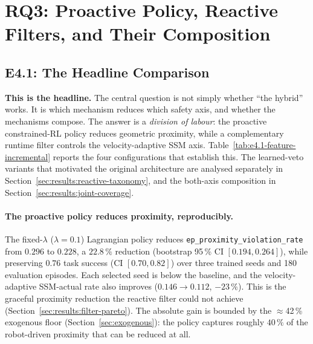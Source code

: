 \documentclass[11pt,a4paper]{report}
\newcommand{\ssm}{SSM}
\begin{document}
\section{RQ3: Proactive Policy, Reactive Filters, and Their Composition}
\label{sec:results:rq3}

\subsection{E4.1: The Headline Comparison}
\label{sec:results:headline-feature-table}

\textbf{This is the headline.} The central question is not simply
whether ``the hybrid'' works. It is which mechanism reduces which
safety axis, and whether the mechanisms compose. The answer is a
\emph{division of labour}: the proactive constrained-RL policy reduces
geometric proximity, while a complementary runtime filter controls the
velocity-adaptive \ssm{} axis. Table~\ref{tab:e4.1-feature-incremental}
reports the four configurations that establish this. The learned-veto
variants that motivated the original architecture are analysed
separately in Section~\ref{sec:results:reactive-taxonomy}, and the
both-axis composition in Section~\ref{sec:results:joint-coverage}.

\paragraph{The proactive policy reduces proximity, reproducibly.}
The fixed-$\lambda$ ($\lambda = 0.1$) Lagrangian policy reduces
\texttt{ep\_proximity\_violation\_rate} from $0.296$ to $0.228$, a
$22.8\,\%$ reduction (bootstrap 95\,\% CI $[0.194, 0.264]$), while
preserving $0.76$ task success (CI $[0.70, 0.82]$) over three trained
seeds and 180 evaluation episodes. Each selected seed is below the
baseline, and the velocity-adaptive \ssm{}-actual rate also improves
($0.146 \rightarrow 0.112$, $-23\,\%$). This is the graceful proximity
reduction the reactive filter could not achieve
(Section~\ref{sec:results:filter-pareto}). The absolute gain is bounded
by the $\approx$42\,\% exogenous floor (Section~\ref{sec:exogenous}):
the policy captures roughly $40\,\%$ of the robot-driven proximity
that can be reduced at all.
\end{document}
